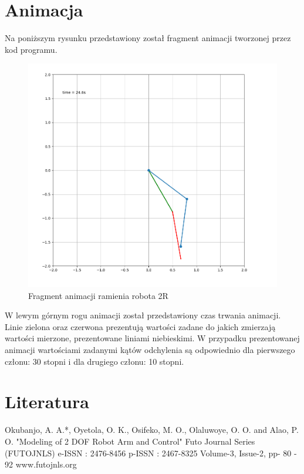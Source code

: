 \documentclass[fleqn,10pt]{physiome}
\begin{document}
\section{Animacja}
Na poniższym rysunku przedstawiony został fragment animacji tworzonej przez kod programu.
\newline
\begin{figure}[ht]
\centering
\includegraphics[width=0.8\linewidth]{zdjecie_monitory.PNG}
\caption{Fragment animacji ramienia robota 2R}
\label{fig:view}
\end{figure}
\newline
W lewym górnym rogu animacji został przedstawiony czas trwania animacji. Linie zielona oraz czerwona prezentują wartości zadane do jakich zmierzają wartości mierzone, prezentowane liniami niebieskimi. W przypadku prezentowanej animacji wartościami zadanymi kątów odchylenia są odpowiednio dla pierwszego członu: 30 stopni i dla drugiego członu: 10 stopni.

\section{Literatura}
Okubanjo, A. A.*, Oyetola, O. K., Osifeko, M. O., Olaluwoye, O. O. and Alao, P. O. "Modeling of 2 DOF Robot Arm and Control" Futo Journal Series (FUTOJNLS)
e-ISSN : 2476-8456 p-ISSN : 2467-8325
Volume-3, Issue-2, pp- 80 - 92
www.futojnls.org
\end{document}
